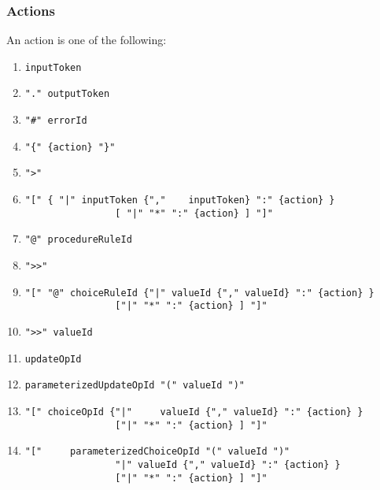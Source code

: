 \subsubsection{Actions}

An action is one of the following:
\begin{enumerate}
\item 
\begin{verbatim}
inputToken
\end{verbatim}
\item 
\begin{verbatim}
"." outputToken
\end{verbatim}
           
\item 
\begin{verbatim}
"#" errorId
\end{verbatim}
\item 
\begin{verbatim}
"{" {action} "}"
\end{verbatim}
\item 
\begin{verbatim}
">"
\end{verbatim}
\item 
\begin{verbatim}
"[" { "|" inputToken {","    inputToken} ":" {action} }
                [ "|" "*" ":" {action} ] "]"
\end{verbatim}
\item 
\begin{verbatim}
"@" procedureRuleId
\end{verbatim}
\item 
\begin{verbatim}
">>"
\end{verbatim}
\item 
\begin{verbatim}
"[" "@" choiceRuleId {"|" valueId {"," valueId} ":" {action} }
                ["|" "*" ":" {action} ] "]"
\end{verbatim}
                  
\item 
\begin{verbatim}
">>" valueId
\end{verbatim}
\item 
\begin{verbatim}
updateOpId
\end{verbatim}
\item 
\begin{verbatim}
parameterizedUpdateOpId "(" valueId ")"
\end{verbatim}
\item 
\begin{verbatim}
"[" choiceOpId {"|"     valueId {"," valueId} ":" {action} }
                ["|" "*" ":" {action} ] "]"
\end{verbatim}
\item 
\begin{verbatim}
"["     parameterizedChoiceOpId "(" valueId ")"
                "|" valueId {"," valueId} ":" {action} }
                ["|" "*" ":" {action} ] "]"
\end{verbatim}
\end{enumerate}


